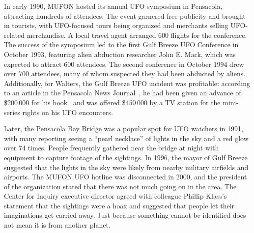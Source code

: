 In early 1990, MUFON hosted its annual UFO symposium in Pensacola, attracting hundreds of attendees. The event garnered free publicity and brought in tourists, with UFO-focused tours being organized and merchants selling UFO-related merchandise. A local travel agent arranged 600 flights for the conference. The success of the symposium led to the first Gulf Breeze UFO Conference in October 1993, featuring alien abduction researcher John E. Mack, which was expected to attract 600 attendees. The second conference in October 1994 drew over 700 attendees, many of whom suspected they had been abducted by aliens. Additionally, for Walters, the Gulf Breeze UFO incident was profitable: according to an article in the Pensacola News Journal~\cite{PensacolaNewsJournal1990}, he had been given an advance of {\$}200\,000 for his book~\cite{Walters1991Jan} and was offered {\$}450\,000 by a TV station for the mini-series rights on his UFO encounters.

Later, the Pensacola Bay Bridge was a popular spot for UFO watchers in 1991, with many reporting seeing a ``pearl necklace''
of lights in the sky and a red glow over 74 times. People frequently gathered near the bridge at night with equipment to capture footage of the sightings. In 1996, the mayor of Gulf Breeze suggested that the lights in the sky were likely from nearby military airfields and airports. The MUFON UFO hotline was disconnected in 2000, and the president of the organization stated that there was not much going on in the area. The Center for Inquiry executive director agreed with colleague Phillip Klass's statement that the sightings were a hoax and suggested that people let their imaginations get carried away. Just because something cannot be identified does not mean it is from another planet.

